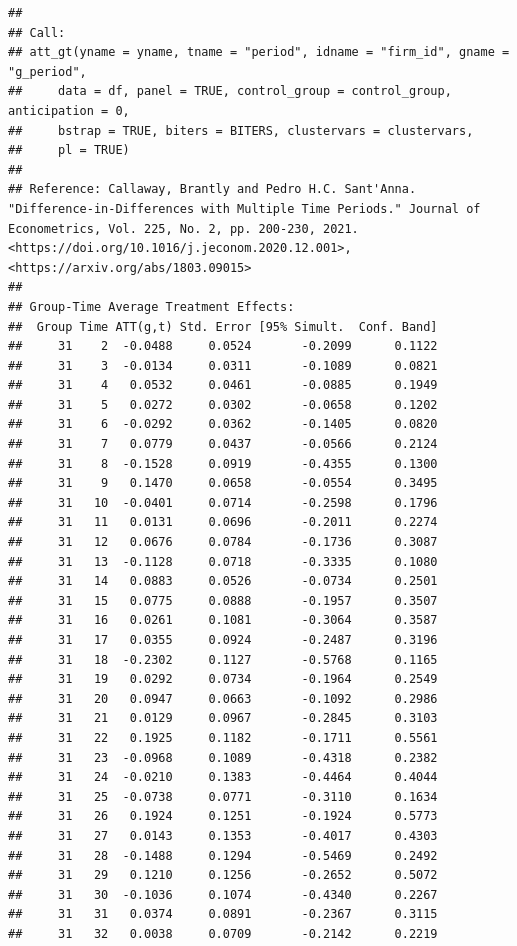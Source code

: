 \documentclass[
]{article}
\begin{document}
\begin{verbatim}
## 
## Call:
## att_gt(yname = yname, tname = "period", idname = "firm_id", gname = "g_period", 
##     data = df, panel = TRUE, control_group = control_group, anticipation = 0, 
##     bstrap = TRUE, biters = BITERS, clustervars = clustervars, 
##     pl = TRUE)
## 
## Reference: Callaway, Brantly and Pedro H.C. Sant'Anna.  "Difference-in-Differences with Multiple Time Periods." Journal of Econometrics, Vol. 225, No. 2, pp. 200-230, 2021. <https://doi.org/10.1016/j.jeconom.2020.12.001>, <https://arxiv.org/abs/1803.09015> 
## 
## Group-Time Average Treatment Effects:
##  Group Time ATT(g,t) Std. Error [95% Simult.  Conf. Band]  
##     31    2  -0.0488     0.0524       -0.2099      0.1122  
##     31    3  -0.0134     0.0311       -0.1089      0.0821  
##     31    4   0.0532     0.0461       -0.0885      0.1949  
##     31    5   0.0272     0.0302       -0.0658      0.1202  
##     31    6  -0.0292     0.0362       -0.1405      0.0820  
##     31    7   0.0779     0.0437       -0.0566      0.2124  
##     31    8  -0.1528     0.0919       -0.4355      0.1300  
##     31    9   0.1470     0.0658       -0.0554      0.3495  
##     31   10  -0.0401     0.0714       -0.2598      0.1796  
##     31   11   0.0131     0.0696       -0.2011      0.2274  
##     31   12   0.0676     0.0784       -0.1736      0.3087  
##     31   13  -0.1128     0.0718       -0.3335      0.1080  
##     31   14   0.0883     0.0526       -0.0734      0.2501  
##     31   15   0.0775     0.0888       -0.1957      0.3507  
##     31   16   0.0261     0.1081       -0.3064      0.3587  
##     31   17   0.0355     0.0924       -0.2487      0.3196  
##     31   18  -0.2302     0.1127       -0.5768      0.1165  
##     31   19   0.0292     0.0734       -0.1964      0.2549  
##     31   20   0.0947     0.0663       -0.1092      0.2986  
##     31   21   0.0129     0.0967       -0.2845      0.3103  
##     31   22   0.1925     0.1182       -0.1711      0.5561  
##     31   23  -0.0968     0.1089       -0.4318      0.2382  
##     31   24  -0.0210     0.1383       -0.4464      0.4044  
##     31   25  -0.0738     0.0771       -0.3110      0.1634  
##     31   26   0.1924     0.1251       -0.1924      0.5773  
##     31   27   0.0143     0.1353       -0.4017      0.4303  
##     31   28  -0.1488     0.1294       -0.5469      0.2492  
##     31   29   0.1210     0.1256       -0.2652      0.5072  
##     31   30  -0.1036     0.1074       -0.4340      0.2267  
##     31   31   0.0374     0.0891       -0.2367      0.3115  
##     31   32   0.0038     0.0709       -0.2142      0.2219  

\end{verbatim}
\end{document}
